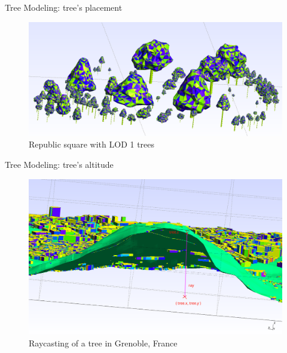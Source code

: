\documentclass[10pt]{beamer}
\begin{document}
\begin{frame}{Tree Modeling: tree's placement}
	\begin{figure}[H]
		  \centering
		  \includegraphics[width=\textwidth]{images/republic-side-view.png}
		  \caption{Republic square with LOD 1 trees}
	\end{figure}
\end{frame}

\begin{frame}{Tree Modeling: tree's altitude}
	\begin{figure}
		\centering
		\includegraphics[width=\textwidth]{images/raycasting.png}
		\caption{Raycasting of a tree in Grenoble, France}
		\label{fig:figure1}
	\end{figure}
\end{frame}
\end{document}
